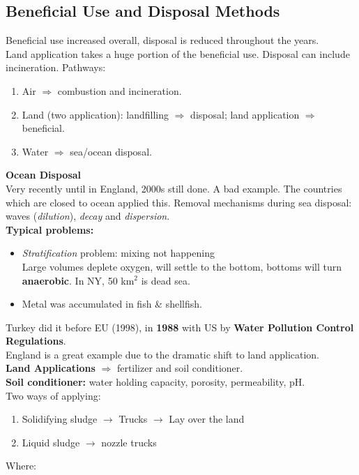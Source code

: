 \documentclass{article}
\numberwithin{equation}{section}
\begin{document}
\subsection{Beneficial Use and Disposal Methods}
Beneficial use increased overall, disposal is reduced throughout the years.\\
Land application takes a huge portion of the beneficial use. Disposal can include incineration.
Pathways:
\begin{enumerate}
    \item Air $\Rightarrow$ combustion and incineration.
    \item Land (two application): landfilling $\Rightarrow$ disposal; land application $\Rightarrow$ beneficial.
    \item Water $\Rightarrow$ sea/ocean disposal.
\end{enumerate}
\textbf{Ocean Disposal}\\
Very recently until in England, 2000s still done. A bad example. The countries which are closed to ocean applied this. Removal mechanisms during sea disposal: waves (\emph{dilution}), \emph{decay} and \emph{dispersion}.\\
\textbf{Typical problems:}
\begin{itemize}
    \item \emph{Stratification} problem: mixing not happening\\
    Large volumes deplete oxygen, will settle to the bottom, bottoms will turn \textbf{anaerobic}. In NY, 50 km$^2$ is dead sea.
    \item Metal was accumulated in fish \& shellfish.
\end{itemize}
Turkey did it before EU (1998), in \textbf{1988} with US by \textbf{Water Pollution Control Regulations}.\\
England is a great example due to the dramatic shift to land application.\\
\textbf{Land Applications} $\Rightarrow$ fertilizer and soil conditioner.\\
\textbf{Soil conditioner:} water holding capacity, porosity, permeability, pH.\\
Two ways of applying:
\begin{enumerate}
    \item Solidifying sludge $\rightarrow$ Trucks $\rightarrow$ Lay over the land
    \item Liquid sludge $\rightarrow$ nozzle trucks
\end{enumerate}
Where:
\end{document}
